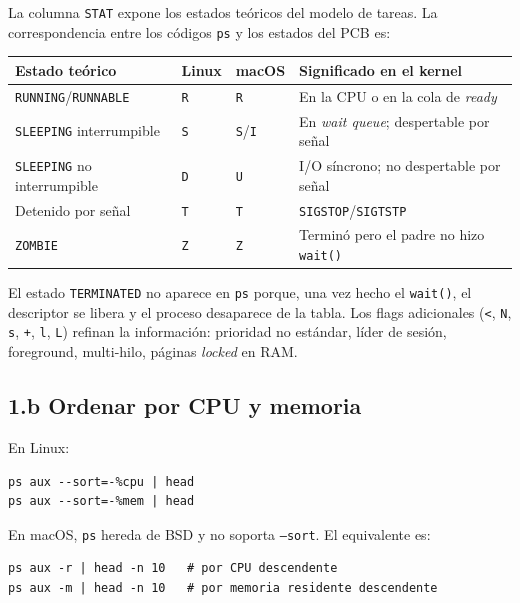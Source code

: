 \documentclass[11pt,a4paper]{article}
\begin{document}
La columna \texttt{STAT} expone los estados teóricos del modelo de
tareas. La correspondencia entre los códigos \texttt{ps} y los estados
del PCB es:

\begin{center}
\small
\begin{tabular}{@{}lllp{6.5cm}@{}}
\toprule
Estado teórico & Linux & macOS & Significado en el kernel \\
\midrule
\texttt{RUNNING}/\texttt{RUNNABLE} & \texttt{R} & \texttt{R} & En la CPU o en la cola de \emph{ready} \\
\texttt{SLEEPING} interrumpible & \texttt{S} & \texttt{S}/\texttt{I} & En \emph{wait queue}; despertable por señal \\
\texttt{SLEEPING} no interrumpible & \texttt{D} & \texttt{U} & I/O síncrono; no despertable por señal \\
Detenido por señal & \texttt{T} & \texttt{T} & \texttt{SIGSTOP}/\texttt{SIGTSTP} \\
\texttt{ZOMBIE} & \texttt{Z} & \texttt{Z} & Terminó pero el padre no hizo \texttt{wait()} \\
\bottomrule
\end{tabular}
\end{center}

El estado \texttt{TERMINATED} no aparece en \texttt{ps} porque, una vez
hecho el \texttt{wait()}, el descriptor se libera y el proceso desaparece
de la tabla. Los flags adicionales (\texttt{<}, \texttt{N}, \texttt{s},
\texttt{+}, \texttt{l}, \texttt{L}) refinan la información: prioridad
no estándar, líder de sesión, foreground, multi-hilo, páginas
\emph{locked} en RAM.

\subsection*{1.b Ordenar por CPU y memoria}

En Linux:

\begin{lstlisting}
ps aux --sort=-%cpu | head
ps aux --sort=-%mem | head
\end{lstlisting}

En macOS, \texttt{ps} hereda de BSD y no soporta \texttt{--sort}. El
equivalente es:

\begin{lstlisting}
ps aux -r | head -n 10   # por CPU descendente
ps aux -m | head -n 10   # por memoria residente descendente
\end{lstlisting}
\end{document}
